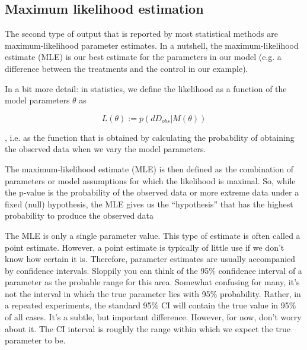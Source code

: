 \documentclass[a4paper,twoside]{tufte-book}\usepackage[]{graphicx}\usepackage[]{color}
\begin{document}
{\subsection{Maximum likelihood estimation}

The second type of output that is reported by most statistical methods are maximum-likelihood parameter estimates. In a nutshell, the maximum-likelihood estimate (MLE) is our best estimate for the parameters in our model (e.g. a difference between the treatments and the control in our example). 

In a bit more detail: in statistics, we define the likelihood as a function of the model parameters $\theta$ as  

\begin{equation}
L(\theta) := p(dD_{obs} | M(\theta))
\end{equation}

, i.e. as the function that is obtained by calculating the probability of obtaining the observed data when we vary the model parameters.

The maximum-likelihood estimate (MLE) is then defined as the combination of parameters or model assumptions for which the likelihood is maximal. So, while the p-value is the probability of the observed data or more extreme data under a fixed (null) hypothesis, the MLE gives us the ``hypothesis'' that has the highest probability to produce the observed data  

The MLE is only a single parameter value. This type of estimate is often called a point estimate. However, a point estimate is typically of little use if we don't know how certain it is. Therefore, parameter estimates are usually accompanied by confidence intervals. Sloppily you can think of the 95\% confidence interval of a parameter as the probable range for this area. Somewhat confusing for many, it's not the interval in which the true parameter lies with 95\% probability. Rather, in a repeated experiments, the standard 95\% CI will contain the true value in 95\% of all cases. It's a subtle, but important difference. However, for now, don't worry about it. The CI interval is roughly the range within which we expect the true parameter to be. 

}
\end{document}
